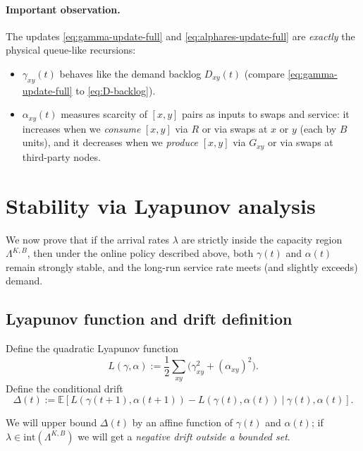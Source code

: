 \documentclass[11pt]{article}
\newcommand{\E}{\mathbb{E}}
\begin{document}
\paragraph{Important observation.}
The updates \eqref{eq:gamma-update-full} and \eqref{eq:alphares-update-full} are \emph{exactly} the physical queue-like recursions:
\begin{itemize}[leftmargin=2em]
\item $\gamma_{xy}(t)$ behaves like the demand backlog $D_{xy}(t)$ (compare \eqref{eq:gamma-update-full} to \eqref{eq:D-backlog}).
\item $\alpha_{xy}(t)$ measures scarcity of $[x,y]$ pairs as inputs to swaps and service: it increases when we \emph{consume} $[x,y]$ via $R$ or via swaps at $x$ or $y$ (each by $B$ units), and it decreases when we \emph{produce} $[x,y]$ via $G_{xy}$ or via swaps at third-party nodes.
\end{itemize}

\section{Stability via Lyapunov analysis}

We now prove that if the arrival rates $\lambda$ are strictly inside the capacity region $\Lambda^{K,B}$, then under the online policy described above, both $\gamma(t)$ and $\alpha(t)$ remain strongly stable, and the long-run service rate meets (and slightly exceeds) demand.

\subsection{Lyapunov function and drift definition}

Define the quadratic Lyapunov function
\begin{equation}
L(\gamma,\alpha)
:= \frac12 \sum_{xy}
\Big(
\gamma_{xy}^2 + (\alpha_{xy})^2
\Big).
\label{eq:Lyap-def}
\end{equation}
Define the conditional drift
\begin{equation}
\Delta(t)
:= \E\!\left[
L(\gamma(t{+}1),\alpha(t{+}1))
-
L(\gamma(t),\alpha(t))
\ \big|\ \gamma(t),\alpha(t)
\right].
\label{eq:drift-def}
\end{equation}

We will upper bound $\Delta(t)$ by an affine function of $\gamma(t)$ and $\alpha(t)$; if $\lambda\in\mathrm{int}(\Lambda^{K,B})$ we will get a \emph{negative drift outside a bounded set}.
\end{document}
